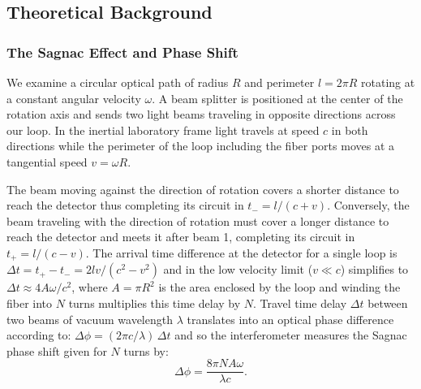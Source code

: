 
\subsection{Theoretical Background}
\label{sec:theory}

\subsubsection{The Sagnac Effect and Phase Shift}
\label{sec:sagnac}

We examine a circular optical path of radius $R$ and perimeter $l = 2\pi R$ rotating at a constant angular velocity $\omega$. A beam splitter is positioned at the center of the rotation axis and sends two light beams traveling in opposite directions across our loop. In the inertial laboratory frame light travels at speed $c$ in both directions while the perimeter of the loop including the fiber ports moves at a tangential speed $v = \omega R$.

The beam moving against the direction of rotation covers a shorter distance to reach the detector thus completing its circuit in $t_- = l/(c+v)$. Conversely, the beam traveling with the direction of rotation must cover a longer distance to reach the detector and meets it after beam 1, completing its circuit in $t_+ = l/(c-v)$. The arrival time difference at the detector for a single loop is $\Delta t = t_+ - t_- = 2lv/(c^2 - v^2)$ and in the low velocity limit ($v \ll c$) simplifies to $\Delta t \approx 4A\omega/c^2$, where $A = \pi R^2$ is the area enclosed by the loop and winding the fiber into $N$ turns multiplies this time delay by $N$. Travel time delay $\Delta t$ between two beams of vacuum wavelength $\lambda$ translates into an optical phase difference according to: $\Delta\phi = (2\pi c/\lambda)\,\Delta t$ and so the interferometer measures the Sagnac phase shift given for $N$ turns by:
\begin{equation}
  \Delta\phi = \frac{8\pi N A \omega}{\lambda c}.
  \label{eq:sagnac}
\end{equation}

